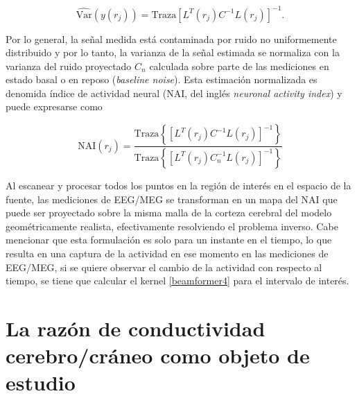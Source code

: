 \begin{equation}
	\label{beamformer3}
	\widehat{\text{Var}}(y(r_j)) = \text{Traza}[L^{T}(r_j)C^{-1}L(r_j)]^{-1}.
\end{equation}

Por lo general, la señal medida está contaminada por ruido no uniformemente distribuido y por lo tanto, la varianza de la señal estimada se normaliza con la varianza del ruido proyectado $C_n$ calculada sobre parte de las mediciones en estado basal o en reposo (\emph{baseline noise}). Esta estimación normalizada es denomida índice de actividad neural (NAI, del inglés \emph{neuronal activity index}) \cite{VanVeen1997} y puede expresarse como

\begin{equation}
	\label{beamformer4}
	\text{NAI}(r_j) = \frac{\text{Traza}\left\{[L^{T}(r_j)C^{-1}L(r_j)]^{-1}\right\}}{\text{Traza}\left\{[L^{T}(r_j)C_n^{-1}L(r_j)]^{-1}\right\}}
\end{equation}

Al escanear y procesar todos los puntos en la región de interés en el espacio de la fuente, las mediciones de EEG/MEG se transforman en un mapa del NAI que puede ser proyectado sobre la misma malla de la corteza cerebral del modelo geométricamente realista, efectivamente resolviendo el problema inverso. Cabe mencionar que esta formulación es solo para un instante en el tiempo, lo que resulta en una captura de la actividad en ese momento en las mediciones de EEG/MEG, si se quiere observar el cambio de la actividad con respecto al tiempo, se tiene que calcular el kernel \cref{beamformer4}  para el intervalo de interés.

\section{La razón de conductividad cerebro/cráneo como objeto de estudio}
\label{sec:intro:study}

